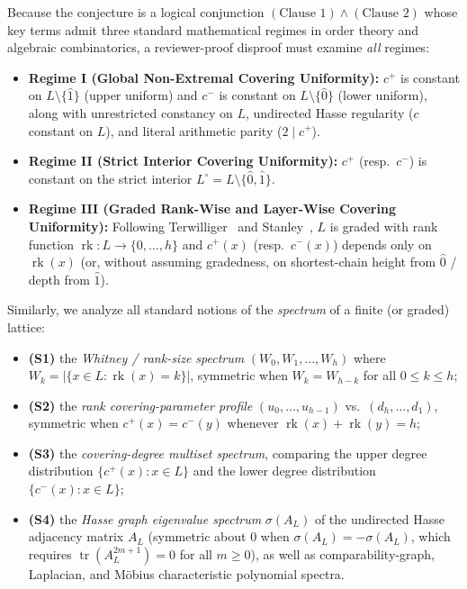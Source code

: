 \documentclass[11pt,a4paper]{article}
\theoremstyle{definition}
\theoremstyle{remark}
\newcommand{\rk}{\operatorname{rk}}
\newcommand{\tr}{\operatorname{tr}}
\begin{document}
Because the conjecture is a logical conjunction $(\text{Clause 1}) \wedge (\text{Clause 2})$ whose key terms admit three standard mathematical regimes in order theory and algebraic combinatorics, a reviewer-proof disproof must examine \emph{all} regimes:
\begin{itemize}
  \item \textbf{Regime I (Global Non-Extremal Covering Uniformity):} $c^+$ is constant on $L \setminus \{\hat{1}\}$ (upper uniform) and $c^-$ is constant on $L \setminus \{\hat{0}\}$ (lower uniform), along with unrestricted constancy on $L$, undirected Hasse regularity ($c$ constant on $L$), and literal arithmetic parity ($2 \mid c^+$).
  \item \textbf{Regime II (Strict Interior Covering Uniformity):} $c^+$ (resp.\ $c^-$) is constant on the strict interior $L^\circ = L \setminus \{\hat{0}, \hat{1}\}$.
  \item \textbf{Regime III (Graded Rank-Wise and Layer-Wise Covering Uniformity):} Following Terwilliger~\cite{Terwilliger1990} and Stanley~\cite{StanleyEC1}, $L$ is graded with rank function $\rk : L \to \{0, \dots, h\}$ and $c^+(x)$ (resp.\ $c^-(x)$) depends only on $\rk(x)$ (or, without assuming gradedness, on shortest-chain height from $\hat{0}$ / depth from $\hat{1}$).
\end{itemize}

Similarly, we analyze all standard notions of the \emph{spectrum} of a finite (or graded) lattice:
\begin{itemize}
  \item \textbf{(S1)} the \emph{Whitney / rank-size spectrum} $(W_0, W_1, \dots, W_h)$ where $W_k = |\{x \in L : \rk(x) = k\}|$, symmetric when $W_k = W_{h-k}$ for all $0 \le k \le h$;
  \item \textbf{(S2)} the \emph{rank covering-parameter profile} $(u_0, \dots, u_{h-1})$ vs.\ $(d_h, \dots, d_1)$, symmetric when $c^+(x) = c^-(y)$ whenever $\rk(x) + \rk(y) = h$;
  \item \textbf{(S3)} the \emph{covering-degree multiset spectrum}, comparing the upper degree distribution $\{c^+(x) : x \in L\}$ and the lower degree distribution $\{c^-(x) : x \in L\}$;
  \item \textbf{(S4)} the \emph{Hasse graph eigenvalue spectrum} $\sigma(A_L)$ of the undirected Hasse adjacency matrix $A_L$ (symmetric about $0$ when $\sigma(A_L) = -\sigma(A_L)$, which requires $\tr(A_L^{2m+1}) = 0$ for all $m \ge 0$), as well as comparability-graph, Laplacian, and M\"obius characteristic polynomial spectra.
\end{itemize}
\end{document}
